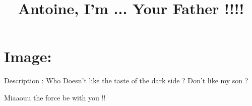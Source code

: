 \documentclass[11pt,a4paper]{article}
\title{Antoine, I'm ... Your Father !!!!}
\begin{document}
\maketitle
\section*{Image: }
\frame
{
\href{http://lo21.jonathandekhtiar.eu/img/1.png}{}
}
Description : 
Who Doesn't like the taste of the dark side ?
Don't like my son ?

Miaaouu the force be with you !!
\end{document}
